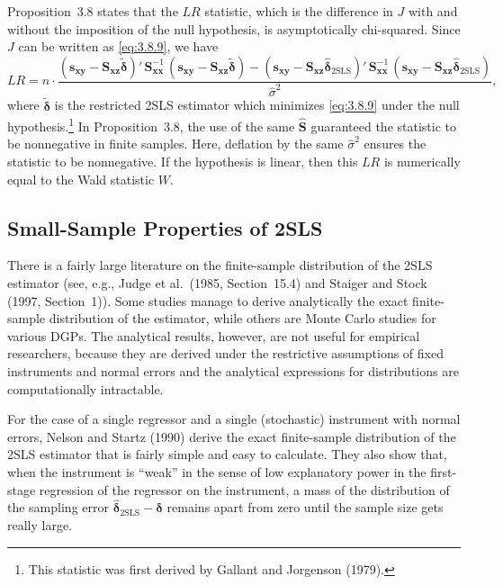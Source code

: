 Proposition~3.8 states that the $LR$ statistic, which is the difference in $J$ with and
without the imposition of the null hypothesis, is asymptotically chi-squared.  Since
$J$ can be written as \eqref{eq:3.8.9}, we have
\begin{equation}
  LR = n \cdot \frac{(\mathbf{s}_{\mathbf{xy}}
    - \mathbf{S}_{\mathbf{xz}} \tilde{\boldsymbol{\delta}})'\,
    \mathbf{S}_{\mathbf{xx}}^{-1}\,
    (\mathbf{s}_{\mathbf{xy}}
    - \mathbf{S}_{\mathbf{xz}} \tilde{\boldsymbol{\delta}})
  - (\mathbf{s}_{\mathbf{xy}}
    - \mathbf{S}_{\mathbf{xz}} \hat{\boldsymbol{\delta}}_{\text{2SLS}})'\,
    \mathbf{S}_{\mathbf{xx}}^{-1}\,
    (\mathbf{s}_{\mathbf{xy}}
    - \mathbf{S}_{\mathbf{xz}} \hat{\boldsymbol{\delta}}_{\text{2SLS}})}
    {\hat{\sigma}^2},
  \label{eq:3.8.11}
\end{equation}
where $\tilde{\boldsymbol{\delta}}$ is the restricted 2SLS estimator which minimizes \eqref{eq:3.8.9}
under the null hypothesis.\footnote{This statistic was first derived by Gallant and
Jorgenson (1979).}  In Proposition~3.8, the use of the same $\hat{\mathbf{S}}$ guaranteed the
statistic to be nonnegative in finite samples.  Here, deflation by the same $\hat{\sigma}^2$
ensures the statistic to be nonnegative.  If the hypothesis is linear, then this $LR$ is
numerically equal to the Wald statistic $W$.

\subsection*{Small-Sample Properties of 2SLS}

There is a fairly large literature on the finite-sample distribution of the 2SLS estimator
(see, e.g., Judge et al.\ (1985, Section~15.4) and Staiger and Stock (1997,
Section~1)).  Some studies manage to derive analytically the exact finite-sample
distribution of the estimator, while others are Monte Carlo studies for various
DGPs.  The analytical results, however, are not useful for empirical researchers,
because they are derived under the restrictive assumptions of fixed instruments and
normal errors and the analytical expressions for distributions are computationally
intractable.

For the case of a single regressor and a single (stochastic) instrument with
normal errors, Nelson and Startz (1990) derive the exact finite-sample distribution
of the 2SLS estimator that is fairly simple and easy to calculate.  They also show
that, when the instrument is ``weak'' in the sense of low explanatory power in the
first-stage regression of the regressor on the instrument, a mass of the distribution
of the sampling error $\hat{\boldsymbol{\delta}}_{\text{2SLS}} - \boldsymbol{\delta}$ remains apart from zero
until the sample size gets really large.


